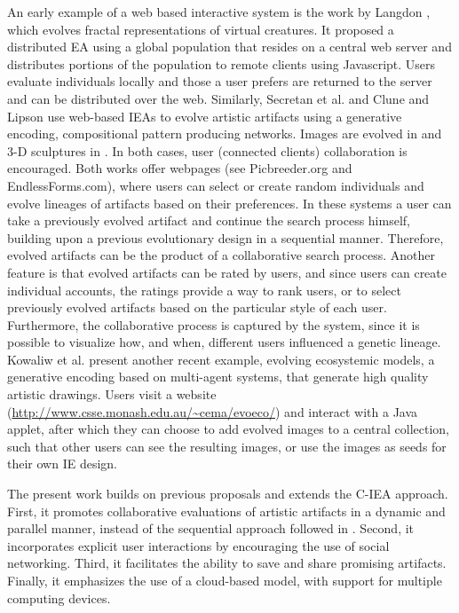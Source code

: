 \documentclass{llncs}
\begin{document}
An early example of a web based interactive system is the work by Langdon \cite{langdon:2004}, which evolves fractal representations of virtual creatures.
It proposed a distributed EA using a global population that resides on a central web server and distributes
portions of the population to remote clients using Javascript.
Users evaluate individuals locally and those a user prefers are returned to the server and can be distributed over the web.
Similarly, Secretan et al. \cite{picbreeder} and Clune and Lipson \cite{forms} use web-based IEAs to evolve artistic artifacts
using a generative encoding, compositional pattern producing networks.
Images are evolved in \cite{picbreeder} and 3-D sculptures in \cite{forms} .
In both cases, user (connected clients) collaboration is encouraged.
Both works offer webpages (see Picbreeder.org and EndlessForms.com),
where users can select or create random individuals and evolve lineages of artifacts based on their preferences.
In these systems a user can take a previously evolved artifact and continue the search process himself, building upon a previous evolutionary design in a sequential
manner.
Therefore, evolved artifacts can be the product of a collaborative search process.
Another feature is that evolved artifacts can be rated by users, and since users can create individual accounts, the ratings provide a way to rank users,
or to select previously evolved artifacts based on the particular style of each user.
Furthermore, the collaborative process is captured by the system, since it is possible to visualize how, and when, different users influenced
a genetic lineage.
Kowaliw et al. \cite{evoeco} present another recent example, evolving ecosystemic models, a generative encoding based on multi-agent systems,
that generate high quality artistic drawings.
Users visit a website (\url{http://www.csse.monash.edu.au/~cema/evoeco/}) and interact with a Java applet,
after which they can choose to add evolved images to a central collection,
such that other users can see the resulting images, or use the images as seeds for their own IE design.

The present work builds on previous proposals and extends the C-IEA approach.
First, it promotes collaborative evaluations of artistic artifacts in a dynamic and parallel manner,
instead of the sequential approach followed in \cite{picbreeder,forms}.
Second, it incorporates explicit user interactions by encouraging the use of social networking.
Third, it facilitates the ability to save and share promising artifacts.
Finally, it emphasizes the use of a cloud-based model, with support for multiple computing devices.
\end{document}

